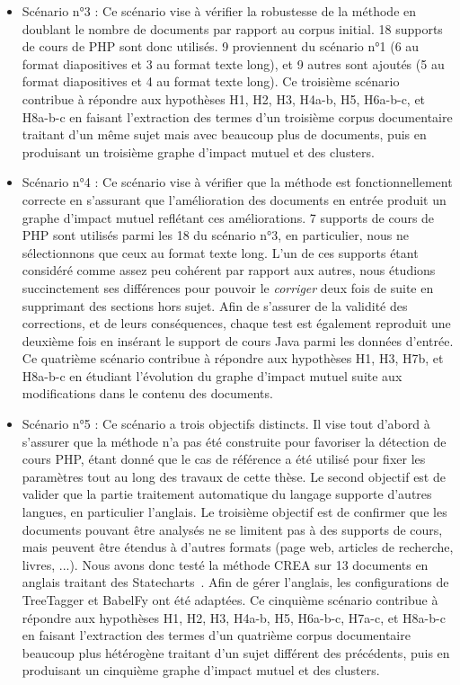\begin{itemize}
\item Scénario n°3 : Ce scénario vise à vérifier la robustesse de la méthode en doublant le nombre de documents par rapport au corpus initial.
18 supports de cours de PHP sont donc utilisés.
9 proviennent du scénario n°1 (6 au format diapositives et 3 au format texte long), et 9 autres sont ajoutés (5 au format diapositives et 4 au format texte long).
Ce troisième scénario contribue à répondre aux hypothèses H1, H2, H3, H4a-b, H5, H6a-b-c, et H8a-b-c en faisant l'extraction des termes d'un troisième corpus documentaire traitant d'un même sujet mais avec beaucoup plus de documents, puis en produisant un troisième graphe d'impact mutuel et des clusters. \\

\item Scénario n°4 : Ce scénario vise à vérifier que la méthode est fonctionnellement correcte en s'assurant que l'amélioration des documents en entrée produit un graphe d'impact mutuel reflétant ces améliorations.
7 supports de cours de PHP sont utilisés parmi les 18 du scénario n°3, en particulier, nous ne sélectionnons que ceux au format texte long.
L'un de ces supports étant considéré comme assez peu cohérent par rapport aux autres, nous étudions succinctement ses différences pour pouvoir le \textit{corriger} deux fois de suite en supprimant des sections hors sujet.
Afin de s'assurer de la validité des corrections, et de leurs conséquences, chaque test est également reproduit une deuxième fois en insérant le support de cours Java parmi les données d'entrée.
Ce quatrième scénario contribue à répondre aux hypothèses H1, H3, H7b, et H8a-b-c en étudiant l'évolution du graphe d'impact mutuel suite aux modifications dans le contenu des documents.

\item Scénario n°5 : Ce scénario a trois objectifs distincts.
Il vise tout d'abord à s'assurer que la méthode n'a pas été construite pour favoriser la détection de cours PHP, étant donné que le cas de référence a été utilisé pour fixer les paramètres tout au long des travaux de cette thèse.
Le second objectif est de valider que la partie traitement automatique du langage supporte d'autres langues, en particulier l'anglais.
Le troisième objectif est de confirmer que les documents pouvant être analysés ne se limitent pas à des supports de cours, mais peuvent être étendus à d'autres formats (page web, articles de recherche, livres, ...).
Nous avons donc testé la méthode CREA sur 13 documents en anglais traitant des Statecharts~\cite{harel1987statecharts}.
Afin de gérer l'anglais, les configurations de TreeTagger et BabelFy ont été adaptées.
Ce cinquième scénario contribue à répondre aux hypothèses H1, H2, H3, H4a-b, H5, H6a-b-c, H7a-c, et H8a-b-c en faisant l'extraction des termes d'un quatrième corpus documentaire beaucoup plus hétérogène traitant d'un sujet différent des précédents, puis en produisant un cinquième graphe d'impact mutuel et des clusters. \\

\end{itemize}

